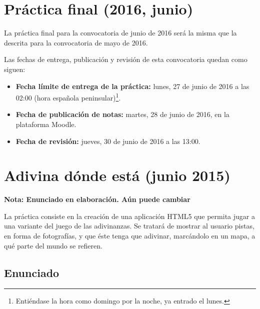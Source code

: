 \section{Práctica final (2016, junio)}
\label{practica-final-2016-06}

La práctica final para la convocatoria de junio de 2016 será la misma que la descrita para la convocatoria de mayo de 2016.

Las fechas de entrega, publicación y revisión de esta convocatoria quedan como siguen:

\begin{itemize}
  \item \textbf{Fecha límite de entrega de la práctica:} lunes, 27 de junio de 2016 a las 02:00 (hora española peninsular)\footnote{Entiéndase la hora como domingo por la noche, ya entrado el lunes.}.

  \item \textbf{Fecha de publicación de notas:} martes, 28 de junio de 2016, en la plataforma Moodle.

  \item \textbf{Fecha de revisión:} jueves, 30 de junio de 2016 a las 13:00.
\end{itemize}




\section{Adivina dónde está (junio 2015)}
\label{sec:final-15-junio}

\textbf{Nota: Enunciado en elaboración. Aún puede cambiar}

La práctica consiste en la creación de una aplicación HTML5 que permita jugar a una variante del juego de las adivinanzas. Se tratará de mostrar al usuario pistas, en forma de fotografías, y que éste tenga que adivinar, marcándolo en un mapa, a qué parte del mundo se refieren.

\subsection{Enunciado}

